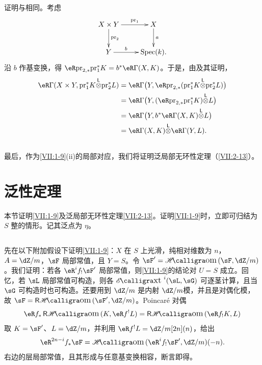 证明与\cite[XVII 5.4.3]{sga4}相同。考虑
\[\xymatrix{X\times Y\ar[r]^-{\pr_1}\ar[d]^-{\pr_2}&X\ar[d]^-a\\Y\ar[r]^-b&\spec(k).}\]
沿 $b$ 作基变换，得 $\eR\pr_{2,\ast}\pr_1^\ast K=b^\ast\eR\Gamma(X,K)$。于是，由\cite[XVII 5.2.11]{sga4}及其证明，
\begin{align*}
 \eR\Gamma(X\times Y,\pr_1^\ast K\lotimes\pr_2^\ast L)
 &=\eR\Gamma\bigl(Y,\eR\pr_{2,\ast}(\pr_1^\ast K\lotimes\pr_2^\ast L)\bigr)\\
 &=\eR\Gamma\bigl(Y,(\eR\pr_{2,\ast}\pr_1^\ast K)\lotimes L\bigr)\\
 &=\eR\Gamma\bigl(Y,b^\ast\eR\Gamma(X,K)\lotimes L\bigr)\\
 &=\eR\Gamma(X,K)\lotimes\eR\Gamma(Y,L).
\end{align*}
\subsection{}\label{VII:1-12}
最后，作为\ref{VII:1-9}(ii)的局部对应，我们将证明泛局部无环性定理（\ref{VII:2-13}）。

\section{泛性定理}\label{VII:2}
本节证明\ref{VII:1-9}及泛局部无环性定理\ref{VII:2-13}。证明\ref{VII:1-9}时，立即可归结为 $S$ 整的情形。记其泛点为 $\eta$。
\subsection{}\label{VII:2-1}
先在以下附加假设下证明\ref{VII:1-9}：$X$ 在 $S$ 上光滑，纯相对维数为 $n$，$A=\dZ/m$，$\sF$ 局部常值，且 $Y=S$。令 $\sF'=\Hom(\sF,\dZ/m)$。我们证明：若各 $\eR^i f_!\sF'$ 局部常值，则\ref{VII:1-9}的结论对 $U=S$ 成立。回忆，若 $\sL$ 局部常值可构造，则各 $\Ext^i(\sL,\sG)$ 可逐茎计算，且当 $\sG$ 可构造时也可构造。还要用到 $\dZ/m$ 是内射 $\dZ/m$模，并且是对偶化模，故 $\sF=\rHom(\sF',\dZ/m)$。Poincaré 对偶
\[
 \eR f_\ast\rHom(K,\eR f^!L)=\rHom(\eR f_!K,L)
\]
取 $K=\sF'$、$L=\dZ/m$，并利用 $\eR f^!L=\dZ/m[2n](n)$，给出
\[
 \eR^{2n-i} f_\ast\sF=\Hom(\eR^i f_!\sF',\dZ/m)(-n).
\]
右边的层局部常值，且其形成与任意基变换相容，断言即得。
